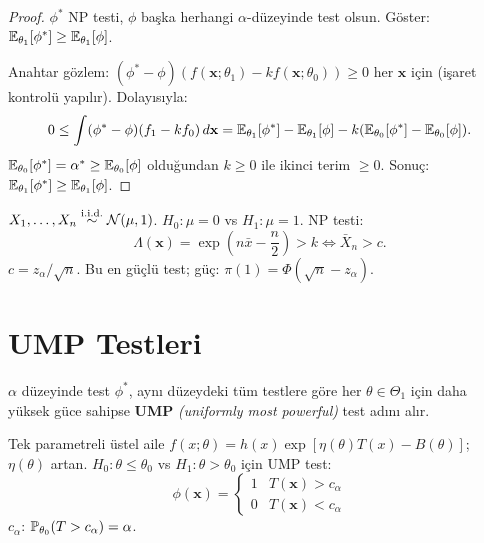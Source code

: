 \begin{proof}
$\phi^*$ NP testi, $\phi$ başka herhangi $\alpha$-düzeyinde test olsun. Göster: $\mathbb{E}_{\theta_1}[\phi^*]\geq\mathbb{E}_{\theta_1}[\phi]$.

Anahtar gözlem: $(\phi^*-\phi)(f(\mathbf{x};\theta_1)-kf(\mathbf{x};\theta_0))\geq0$ her $\mathbf{x}$ için (işaret kontrolü yapılır). Dolayısıyla:
\[
  0\leq\int(\phi^*-\phi)(f_1-kf_0)\,d\mathbf{x}
  = \mathbb{E}_{\theta_1}[\phi^*]-\mathbb{E}_{\theta_1}[\phi] - k(\mathbb{E}_{\theta_0}[\phi^*]-\mathbb{E}_{\theta_0}[\phi]).
\]
$\mathbb{E}_{\theta_0}[\phi^*]=\alpha^*\geq\mathbb{E}_{\theta_0}[\phi]$ olduğundan $k\geq0$ ile ikinci terim $\geq0$. Sonuç: $\mathbb{E}_{\theta_1}[\phi^*]\geq\mathbb{E}_{\theta_1}[\phi]$.
\end{proof}

\begin{ornek}\label{ex:normal_np}
$X_1,\ldots,X_n\overset{\text{i.i.d.}}{\sim}\mathcal{N}(\mu,1)$. $H_0:\mu=0$ vs $H_1:\mu=1$. NP testi:
\[
  \Lambda(\mathbf{x}) = \exp\!\left(n\bar{x} - \frac{n}{2}\right)>k \iff \bar{X}_n > c.
\]
$c = z_\alpha/\sqrt{n}$. Bu en güçlü test; güç: $\pi(1)=\Phi(\sqrt{n}-z_\alpha)$.
\end{ornek}

\section{UMP Testleri}
\label{sec:ump}

\begin{tanim}[UMP]\label{def:ump}
$\alpha$ düzeyinde test $\phi^*$, aynı düzeydeki tüm testlere göre her $\theta\in\Theta_1$ için daha yüksek güce sahipse \textbf{UMP} \emph{(uniformly most powerful)} test adını alır.
\end{tanim}

\begin{teorem}\label{thm:ustel_ump}
Tek parametreli üstel aile $f(x;\theta)=h(x)\exp[\eta(\theta)T(x)-B(\theta)]$; $\eta(\theta)$ artan. $H_0:\theta\leq\theta_0$ vs $H_1:\theta>\theta_0$ için UMP test:
\[
  \phi(\mathbf{x}) = \begin{cases}1&T(\mathbf{x})>c_\alpha\\0&T(\mathbf{x})<c_\alpha\end{cases}
\]
$c_\alpha$: $\mathbb{P}_{\theta_0}(T>c_\alpha)=\alpha$.
\end{teorem}


